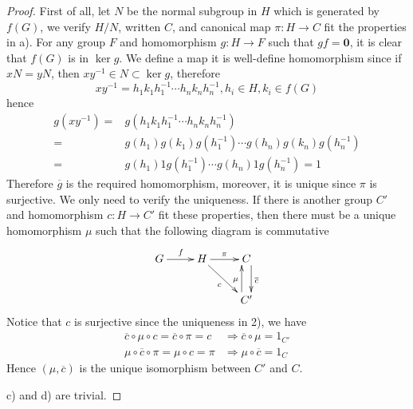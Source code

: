 \begin{proof}
  First of all, let $N$ be the normal subgroup in $H$ which is generated by $f(G)$, we verify $H/N$, written $C$, and canonical map $\pi\colon H\to C$ fit the properties in a).
  For any group $F$ and homomorphism $g\colon H\to F$ such that $gf=\mathbf{0}$, it is clear that $f(G)$ is in $\ker g$. We define a map
  it is well-define homomorphism since if $xN=yN$, then $xy^{-1}\in N\subset\ker g$, therefore
  \begin{equation*}
  xy^{-1}=h_1k_1h_1^{-1}\cdots h_nk_nh_n^{-1}, h_i\in H,k_i\in f(G)
  \end{equation*}
  hence
  \begin{align*}
    g(xy^{-1}) =& g(h_1k_1h_1^{-1}\cdots h_nk_nh_n^{-1}) \\
    =& g(h_1)g(k_1)g(h_1^{-1})\cdots g(h_n)g(k_n)g(h_n^{-1})\\
    =& g(h_1)1g(h_1^{-1})\cdots g(h_n)1g(h_n^{-1})=1
  \end{align*}
  Therefore $\overline{g}$ is the required homomorphism, moreover, it is unique since $\pi$ is surjective.
  We only need to verify the uniqueness. If there is another group $C'$ and homomorphism $c\colon H\to C'$ fit these properties, then there must be a unique homomorphism $\mu$ such that the following diagram is commutative
\begin{displaymath}
   \xymatrix{
   G\ar[r]^{f}&H\ar[r]^{\pi}\ar[dr]_{c}&C\ar@<1ex>[d]^{\overline{c}}\\
   &&C'\ar@<1ex>[u]^{\mu}
   }
\end{displaymath}
Notice that $c$ is surjective since the uniqueness in 2), we have
\begin{align*}
  \overline{c}\circ\mu\circ c = \overline{c}\circ\pi=c &\Rightarrow \overline{c}\circ\mu=1_{C'}\\
  \mu\circ \overline{c}\circ\pi = \mu\circ c=\pi &\Rightarrow \mu\circ \overline{c}=1_C
\end{align*}
Hence $(\mu,\overline{c})$ is the unique isomorphism between $C'$ and $C$.

c) and d) are trivial.
\end{proof}

